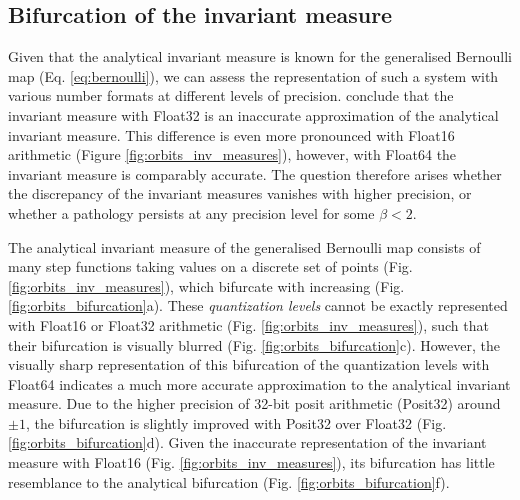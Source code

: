 \subsection{Bifurcation of the invariant measure}
\label{sec:bifurcation}

Given that the analytical invariant measure is known for the generalised Bernoulli map (Eq. \ref{eq:bernoulli}), we can assess
the representation of such a system with various number formats at different levels of precision. \cite{Boghosian2019} conclude
that the invariant measure with Float32 is an inaccurate approximation of the analytical invariant measure. This difference is even
more pronounced with Float16 arithmetic (Figure \ref{fig:orbits_inv_measures}), however, with Float64 the invariant measure is
comparably accurate. The question therefore arises whether the discrepancy of the invariant measures vanishes with higher precision,
or whether a pathology persists at any precision level for some $\beta < 2$.

The analytical invariant measure of the generalised Bernoulli map consists of many step functions taking values on a discrete set
of points (Fig. \ref{fig:orbits_inv_measures}), which bifurcate with increasing (Fig. \ref{fig:orbits_bifurcation}a). These \emph{quantization levels}
cannot be exactly represented with Float16 or Float32 arithmetic (Fig. \ref{fig:orbits_inv_measures}), such that their bifurcation is visually
blurred (Fig. \ref{fig:orbits_bifurcation}c). However, the visually sharp representation of this bifurcation of the quantization levels with Float64
indicates a much more accurate approximation to the analytical invariant measure. Due to the higher precision of 32-bit posit arithmetic
(Posit32) around $\pm1$, the bifurcation is slightly improved with Posit32 over Float32 (Fig. \ref{fig:orbits_bifurcation}d). Given the
inaccurate representation of the invariant measure with Float16 (Fig. \ref{fig:orbits_inv_measures}), its bifurcation has little resemblance
to the analytical bifurcation (Fig. \ref{fig:orbits_bifurcation}f).

